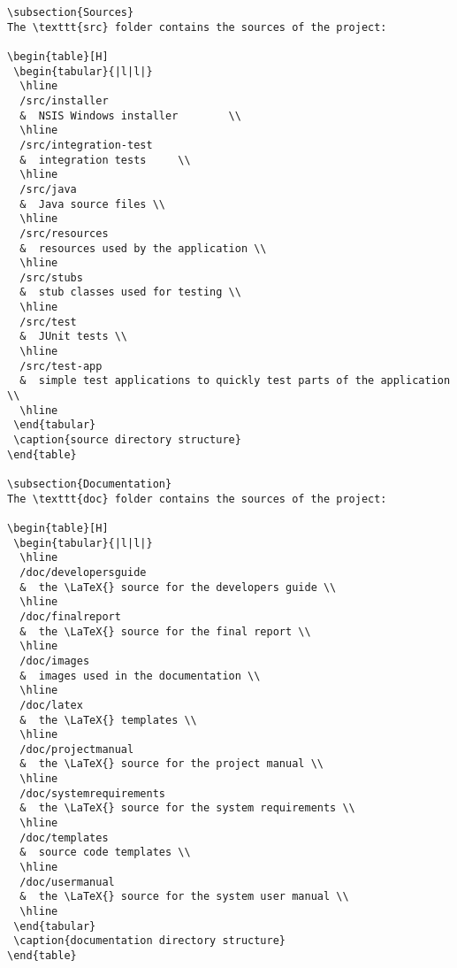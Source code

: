 \documentclass[11pt,a4paper]{article}
\begin{document}
{\begin{verbatim}
\subsection{Sources}
The \texttt{src} folder contains the sources of the project:

\begin{table}[H]
 \begin{tabular}{|l|l|}
  \hline
  /src/installer
  &  NSIS Windows installer        \\
  \hline
  /src/integration-test
  &  integration tests     \\
  \hline
  /src/java
  &  Java source files \\
  \hline
  /src/resources
  &  resources used by the application \\
  \hline
  /src/stubs 
  &  stub classes used for testing \\
  \hline
  /src/test
  &  JUnit tests \\
  \hline
  /src/test-app
  &  simple test applications to quickly test parts of the application \\
  \hline
 \end{tabular}
 \caption{source directory structure}
\end{table}

\subsection{Documentation}
The \texttt{doc} folder contains the sources of the project:

\begin{table}[H]
 \begin{tabular}{|l|l|}
  \hline
  /doc/developersguide
  &  the \LaTeX{} source for the developers guide \\
  \hline
  /doc/finalreport
  &  the \LaTeX{} source for the final report \\
  \hline
  /doc/images
  &  images used in the documentation \\
  \hline
  /doc/latex
  &  the \LaTeX{} templates \\
  \hline
  /doc/projectmanual
  &  the \LaTeX{} source for the project manual \\
  \hline
  /doc/systemrequirements
  &  the \LaTeX{} source for the system requirements \\
  \hline
  /doc/templates
  &  source code templates \\
  \hline
  /doc/usermanual
  &  the \LaTeX{} source for the system user manual \\
  \hline
 \end{tabular}
 \caption{documentation directory structure}
\end{table}



\end{verbatim}}
\end{document}
